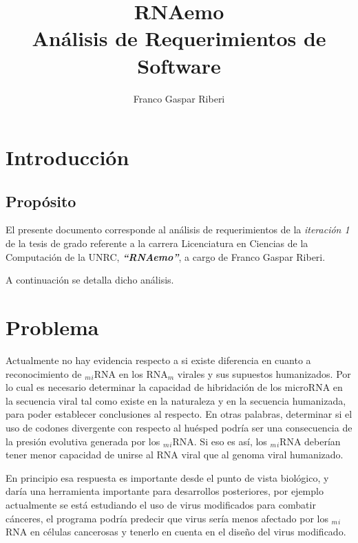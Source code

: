 \documentclass[12pt,a4paper,spanish]{article}
\title{\textbf{RNAemo}\\ \vspace{0.45cm} Análisis de Requerimientos de Software}
\author{Franco Gaspar Riberi}
\begin{document}
\maketitle\pagebreak{}\tableofcontents{}\pagebreak{}

\newpage


\section{Introducción}
\subsection{Propósito}
	\par El presente documento corresponde al análisis de requerimientos de la \emph{iteración 1} de la tesis de grado 		referente a la carrera Licenciatura en Ciencias de la Computación de la UNRC, \textit{\textbf{``RNAemo''}}, a cargo de 		Franco Gaspar Riberi.
	\par A continuación se detalla dicho análisis.

\section{Problema}
	\par Actualmente no hay evidencia respecto a si existe diferencia en cuanto a reconocimiento de $_m$$_i$RNA en los 		RNA$_m$	virales y sus supuestos humanizados. Por lo cual es necesario determinar la capacidad de hibridación de los 	microRNA en la secuencia viral tal como existe en la naturaleza y en la secuencia humanizada, para poder establecer 	conclusiones al respecto. En otras palabras, determinar si el uso de codones divergente con respecto al huésped podría 		ser una consecuencia de la presión evolutiva generada por los $_m$$_i$RNA. Si eso es así, los $_m$$_i$RNA deberían 		tener menor capacidad de unirse al RNA viral que al genoma viral humanizado. 

	\par En principio esa respuesta es importante desde el punto de vista biológico, y daría una herramienta importante 	para desarrollos posteriores, por ejemplo actualmente se está estudiando el uso de virus modificados para combatir 		cánceres, el programa podría predecir que virus sería menos afectado por los $_m$$_i$RNA en células cancerosas y 		tenerlo en cuenta en el diseño del virus modificado.
\end{document}
